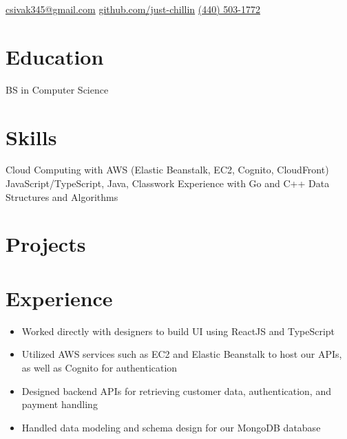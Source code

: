 \documentclass{cv}
\begin{document}
	
	\contact
		{\faEnvelopeSquare\space\href{mailto:csivak345@gmail.com}{csivak345@gmail.com}}
		{\faGithub\space\url{github.com/just-chillin}}
		{\faPhone\space\href{tel:14405031772}{(440) 503-1772}}
	
	\section{Education}
	BS in Computer Science
	
	\section{Skills}
	Cloud Computing with AWS (Elastic Beanstalk, EC2, Cognito, CloudFront)\newline
	JavaScript/TypeScript, Java, Classwork Experience with Go and C++\newline
	Data Structures and Algorithms
	
	\section{Projects}
	

	\section{Experience}
	\begin{itemize}
		\item Worked directly with designers to build UI using ReactJS and TypeScript
		\item Utilized AWS services such as EC2 and Elastic Beanstalk to host our APIs, as well as Cognito for authentication
		\item Designed backend APIs for retrieving customer data, authentication, and payment handling
		\item Handled data modeling and schema design for our MongoDB database
	\end{itemize}
\end{document}
